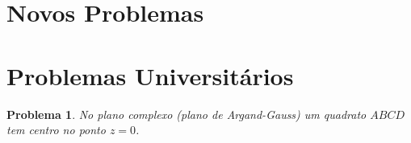 \documentclass{hipatia}
\newtheorem{problem*}{Problema}
\begin{document}
\section{Novos Problemas}


\section{Problemas Universitários}

\begin{problem*}
No plano complexo (plano de Argand-Gauss) um quadrato $ABCD$ tem centro no ponto $z=0$. 
    \begin{center}

\begin{tikzpicture}[x=0.75pt,y=0.75pt,yscale=-0.6,xscale=0.6]


\end{tikzpicture}
\end{center}
\end{problem*}
\end{document}
